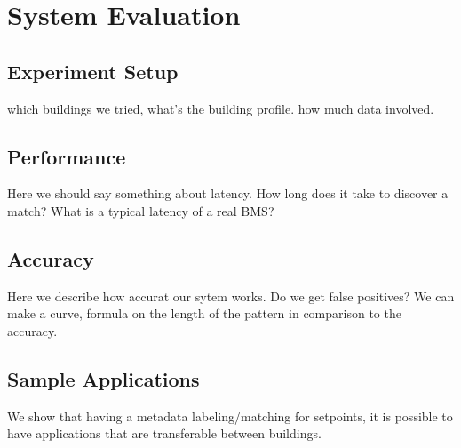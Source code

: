 
%

\section{System Evaluation} %
\label{sec:system_evaluation}


\subsection{Experiment Setup}


which buildings we tried, what's the building profile.
how much data involved.



\subsection{Performance} %
\label{sub:performance}
Here we should say something about latency.
How long does it take to discover a match?
What is a typical latency of a real BMS?



\subsection{Accuracy} %
\label{sub:accuracy}
Here we describe how accurat our sytem works.
Do we get false positives?
We can make a curve, formula on the length of the pattern in comparison to the accuracy.



\subsection{Sample Applications} %
\label{sub:sample_applications}
We show that having a metadata labeling/matching for setpoints, it is possible to have applications that are transferable between buildings.


